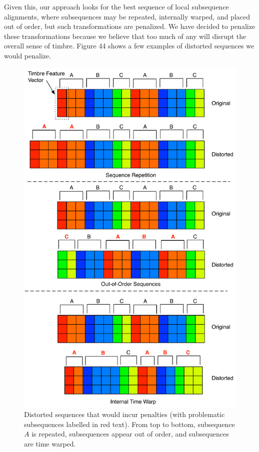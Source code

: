 \documentclass[12pt]{report} 	%
\numberwithin{figure}{chapter}
\numberwithin{table}{chapter}
\numberwithin{equation}{chapter}
\begin{document}
\begin{flushleft}
Given this, our approach looks for the best sequence of local subsequence alignments, where subsequences may be repeated, internally warped, and placed out of order, but such transformations are penalized. We have decided to penalize these transformations because we believe that too much of any will disrupt the overall sense of timbre. Figure 44 shows a few examples of distorted sequences we would penalize.
\begin{figure}[!p]
\begin{center}
\includegraphics[scale = 0.6]{SequencePenalties}
\caption[Proposed sequence similarity penalties]{Distorted sequences that would incur penalties (with problematic subsequences labelled in red text). From top to bottom, subsequence $A$ is repeated, subsequences appear out of order, and subsequences are time warped.}
\end{center}
\vspace{6pt}
\end{figure}


\end{flushleft}
\end{document}
